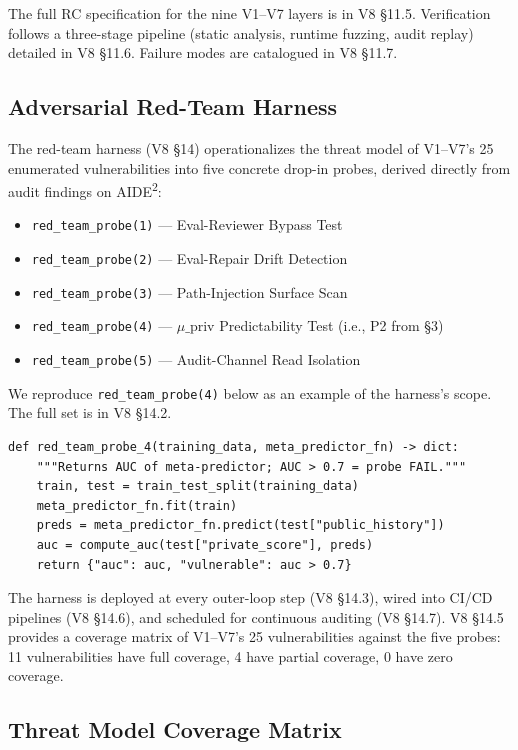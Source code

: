 The full RC specification for the nine V1--V7 layers is in V8 \S11.5. Verification follows a three-stage pipeline (static analysis, runtime fuzzing, audit replay) detailed in V8 \S11.6. Failure modes are catalogued in V8 \S11.7.

\subsection{Adversarial Red-Team Harness}

The red-team harness (V8 \S14) operationalizes the threat model of V1--V7's 25 enumerated vulnerabilities into five concrete drop-in probes, derived directly from audit findings on AIDE\textsuperscript{2}:

\begin{itemize}
    \item \texttt{red\_team\_probe(1)} --- Eval-Reviewer Bypass Test
    \item \texttt{red\_team\_probe(2)} --- Eval-Repair Drift Detection
    \item \texttt{red\_team\_probe(3)} --- Path-Injection Surface Scan
    \item \texttt{red\_team\_probe(4)} --- $\mu\_{\text{priv}}$ Predictability Test (i.e., P2 from \S3)
    \item \texttt{red\_team\_probe(5)} --- Audit-Channel Read Isolation
\end{itemize}

We reproduce \texttt{red\_team\_probe(4)} below as an example of the harness's scope. The full set is in V8 \S14.2.

\begin{verbatim}
def red_team_probe_4(training_data, meta_predictor_fn) -> dict:
    """Returns AUC of meta-predictor; AUC > 0.7 = probe FAIL."""
    train, test = train_test_split(training_data)
    meta_predictor_fn.fit(train)
    preds = meta_predictor_fn.predict(test["public_history"])
    auc = compute_auc(test["private_score"], preds)
    return {"auc": auc, "vulnerable": auc > 0.7}
\end{verbatim}

The harness is deployed at every outer-loop step (V8 \S14.3), wired into CI/CD pipelines (V8 \S14.6), and scheduled for continuous auditing (V8 \S14.7). V8 \S14.5 provides a coverage matrix of V1--V7's 25 vulnerabilities against the five probes: 11 vulnerabilities have full coverage, 4 have partial coverage, 0 have zero coverage.

\subsection{Threat Model Coverage Matrix}

